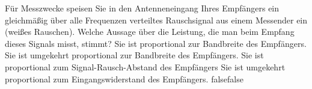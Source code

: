     {Für Messzwecke speisen Sie in den Antenneneingang Ihres Empfängers ein gleichmäßig über alle Frequenzen verteiltes Rauschsignal aus einem Messender ein (weißes Rauschen). Welche Aussage über die Leistung, die man beim Empfang dieses Signals misst, stimmt?}
    {Sie ist proportional zur Bandbreite des Empfängers.}
    {Sie ist umgekehrt proportional zur Bandbreite des Empfängers.}
    {Sie ist proportional zum Signal-Rausch-Abstand des Empfängers}
    {Sie ist umgekehrt proportional zum Eingangswiderstand des Empfängers.}
    {false}{false}